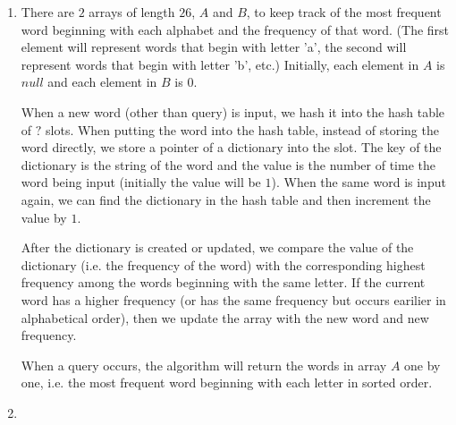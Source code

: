 \documentclass[11pt, answers]{exam}
\theoremstyle{plain}
\theoremstyle{definition}
\begin{document}
\begin{questions}
\begin{solution}
\begin{enumerate}
\item There are $2$ arrays of length $26$, $A$ and $B$, to keep track of the most frequent word beginning with each alphabet and the frequency of that word. (The first element will represent words that begin with letter 'a', the second will represent words that begin with letter 'b', etc.) Initially, each element in $A$ is $null$ and each element in $B$ is $0$. 

When a new word (other than query) is input, we hash it into the hash table of $?$ slots. When putting the word into the hash table, instead of storing the word directly, we store a pointer of a dictionary into the slot. The key of the dictionary is the string of the word and the value is the number of time the word being input (initially the value will be $1$). When the same word is input again, we can find the dictionary in the hash table and then increment the value by $1$. 

After the dictionary is created or updated, we compare the value of the dictionary (i.e. the frequency of the word) with the corresponding highest frequency among the words beginning with the same letter. If the current word has a higher frequency (or has the same frequency but occurs earilier in alphabetical order), then we update the array with the new word and new frequency. 

When a query occurs, the algorithm will return the words in array $A$ one by one, i.e. the most frequent word beginning with each letter in sorted order.

\item 
\end{enumerate}
\end{solution}

\end{questions}
\end{document}
